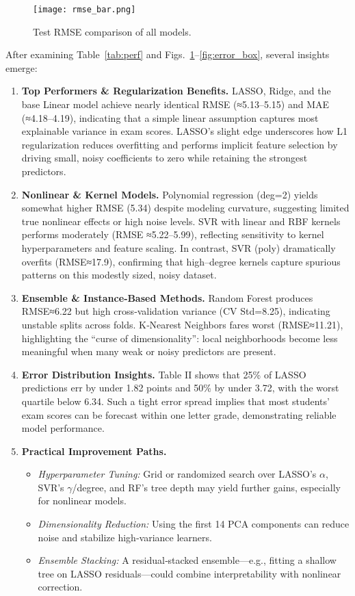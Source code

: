 \documentclass[conference]{IEEEtran}
\begin{document}
\begin{figure}[htbp]
  \centering
  \texttt{[image: rmse\_bar.png]}
  \caption{Test RMSE comparison of all models.}
  \label{fig:rmse_bar}
\end{figure}
After examining Table~\ref{tab:perf} and Figs.~\ref{fig:rmse_bar}–\ref{fig:error_box}, several insights emerge:

\begin{enumerate}
  \item \textbf{Top Performers \& Regularization Benefits.}
    LASSO, Ridge, and the base Linear model achieve nearly identical RMSE (≈5.13–5.15) and MAE (≈4.18–4.19), indicating that a simple linear assumption captures most explainable variance in exam scores. LASSO’s slight edge underscores how L1 regularization reduces overfitting and performs implicit feature selection by driving small, noisy coefficients to zero while retaining the strongest predictors.

  \item \textbf{Nonlinear \& Kernel Models.}
    Polynomial regression (deg=2) yields somewhat higher RMSE (5.34) despite modeling curvature, suggesting limited true nonlinear effects or high noise levels. SVR with linear and RBF kernels performs moderately (RMSE ≈5.22–5.99), reflecting sensitivity to kernel hyperparameters and feature scaling. In contrast, SVR (poly) dramatically overfits (RMSE≈17.9), confirming that high–degree kernels capture spurious patterns on this modestly sized, noisy dataset.

  \item \textbf{Ensemble \& Instance‐Based Methods.}
    Random Forest produces RMSE≈6.22 but high cross‐validation variance (CV Std=8.25), indicating unstable splits across folds. K‐Nearest Neighbors fares worst (RMSE≈11.21), highlighting the “curse of dimensionality”: local neighborhoods become less meaningful when many weak or noisy predictors are present.

  \item \textbf{Error Distribution Insights.}
    Table II shows that 25\% of LASSO predictions err by under 1.82 points and 50\% by under 3.72, with the worst quartile below 6.34. Such a tight error spread implies that most students’ exam scores can be forecast within one letter grade, demonstrating reliable model performance.

  \item \textbf{Practical Improvement Paths.}
    \begin{itemize}
      \item \emph{Hyperparameter Tuning:} Grid or randomized search over LASSO’s $\alpha$, SVR’s $\gamma$/degree, and RF’s tree depth may yield further gains, especially for nonlinear models.
      \item \emph{Dimensionality Reduction:} Using the first 14 PCA components can reduce noise and stabilize high‐variance learners.
      \item \emph{Ensemble Stacking:} A residual‐stacked ensemble—e.g., fitting a shallow tree on LASSO residuals—could combine interpretability with nonlinear correction.
    \end{itemize}
\end{enumerate}
\end{document}
